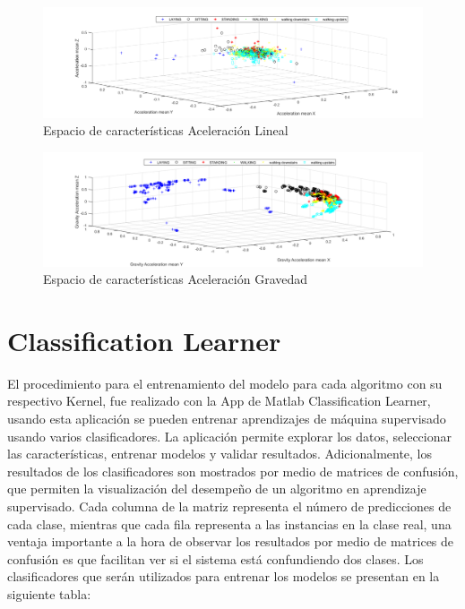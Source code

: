 \documentclass[11pt]{report}
\begin{document}
\begin{figure}[H]
  \centering
    \includegraphics[width=1.2\textwidth]{aceleracion_lineal}
   \caption{Espacio de características Aceleración Lineal}
\end{figure}

\begin{figure}[H]
  \centering
    \includegraphics[width=1.2\textwidth]{aceleracion_gravedad}
   \caption{Espacio de características Aceleración Gravedad}
\end{figure}

\section{Classification Learner}

El procedimiento para el entrenamiento del modelo para cada algoritmo con su respectivo Kernel, fue realizado con la App de Matlab Classification Learner, usando esta aplicación se pueden entrenar aprendizajes de máquina supervisado usando varios clasificadores. La aplicación permite explorar los datos, seleccionar las características, entrenar modelos y validar resultados. Adicionalmente, los resultados de los clasificadores son mostrados por medio de matrices de confusión, que permiten la visualización del desempeño de un algoritmo en aprendizaje supervisado. Cada columna de la matriz representa el número de predicciones de cada clase, mientras que cada fila representa a las instancias en la clase real, una ventaja importante a la hora de observar los resultados por medio de matrices de confusión es que facilitan ver si el sistema está confundiendo dos clases. Los clasificadores que serán utilizados para entrenar los modelos se presentan en la siguiente tabla:
\end{document}
